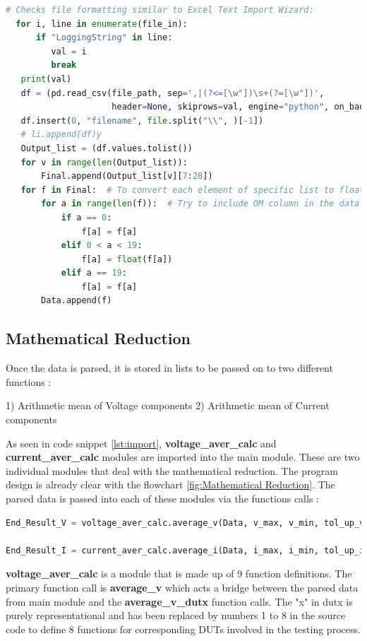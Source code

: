 \begin{lstlisting}[language = Python]
  # Checks file formatting similar to Excel Text Import Wizard:
  for i, line in enumerate(file_in):
      if "LoggingString" in line:
         val = i
         break 
   print(val)
   df = (pd.read_csv(file_path, sep=',|(?<=[\w"])\s+(?=[\w"])',
                     header=None, skiprows=val, engine="python", on_bad_lines="skip").iloc[:, 2:28])
   df.insert(0, "filename", file.split("\\", )[-1])
   # li.append(df)y
   Output_list = (df.values.tolist())
   for v in range(len(Output_list)):
       Final.append(Output_list[v][7:28])
   for f in Final:  # To convert each element of specific list to float
       for a in range(len(f)):  # Try to include OM column in the data !!!
           if a == 0:
               f[a] = f[a]
           elif 0 < a < 19:
               f[a] = float(f[a])
           elif a == 19:
               f[a] = f[a]
       Data.append(f)
\end{lstlisting}

\subsection{Mathematical Reduction}

Once the data is parsed, it is stored in lists to be passed on to two different functions : 

1) Arithmetic mean of Voltage components  2) Arithmetic mean of Current components

As seen in code snippet \ref{lst:import}, \textbf{voltage\_aver\_calc} and \textbf{current\_aver\_calc} modules are imported into the main module. These are two individual modules that deal with the mathematical reduction. The program design is already clear with the flowchart \ref{fig:Mathematical Reduction}. The parsed data is passed into each of these modules via the functions calls :

\begin{lstlisting}[language = Python]
End_Result_V = voltage_aver_calc.average_v(Data, v_max, v_min, tol_up_vmax, tol_low_vmax, tol_up_vmin, tol_low_vmin, DUT_in, perc)

End_Result_I = current_aver_calc.average_i(Data, i_max, i_min, tol_up_imax, tol_low_imax, tol_up_imin, tol_low_imin, DUT_in, perc)
\end{lstlisting}

\textbf{voltage\_aver\_calc} is a module that is made up of 9 function definitions. The primary function call is \textbf{average\_v} which acts a bridge between the parsed data from main module and the \textbf{average\_v\_dutx} function calls. The "x" in dutx is purely representational and has been replaced by numbers 1 to 8 in the source code to define 8 functions for corresponding DUTs involved in the testing process. 

